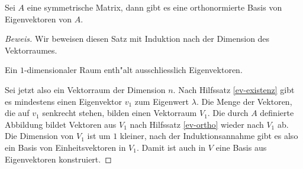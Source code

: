 \begin{satz}
\label{satz:symmetrischdiagonalisierbar}
Sei $A$ eine symmetrische Matrix, dann gibt es eine orthonormierte Basis
von Eigenvektoren von $A$.
\end{satz}

\begin{proof}[Beweis]
Wir beweisen diesen Satz mit Induktion nach der Dimension des Vektorraumes.

Ein $1$-dimensionaler Raum enth"alt ausschliesslich Eigenvektoren.

Sei jetzt also ein Vektorraum der Dimension $n$.
Nach Hilfssatz \ref{ev-existenz} gibt es mindestens einen Eigenvektor $v_1$
zum Eigenwert $\lambda$.
Die Menge der Vektoren, die auf $v_1$ senkrecht
stehen, bilden einen Vektorraum $V_1$.
Die durch $A$ definierte Abbildung
bildet Vektoren aus $V_1$ nach Hilfssatz \ref{ev-ortho} wieder nach
$V_1$ ab.
Die Dimension von $V_1$ ist um $1$ kleiner, nach der
Induktionsannahme gibt es also ein Basis von Einheitsvektoren in $V_1$.
Damit ist auch in $V$ eine Basis aus Eigenvektoren konstruiert.
\end{proof}

